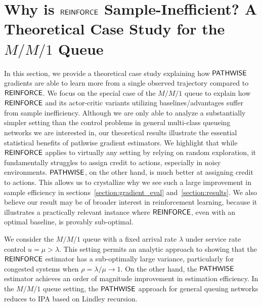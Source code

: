 


\section{Why is $\mathsf{REINFORCE}$ Sample-Inefficient? A Theoretical Case Study for the $M/M/1$ Queue}
\label{section:case_study}

In this section, we provide a theoretical case study explaining how $\mathsf{PATHWISE}$
gradients are able to learn more from a single observed trajectory compared to
$\mathsf{REINFORCE}$. We focus on the special case of the $M/M/1$ queue to explain how
$\mathsf{REINFORCE}$ and its actor-critic variants utilizing baselines/advantages suffer from
sample inefficiency.
Although we are only able to analyze a substantially simpler setting than the control problems in general multi-class queueing networks we are interested in, 
our theoretical results illustrate the essential statistical benefits of pathwise gradient estimators.
We highlight that while $\mathsf{REINFORCE}$ applies to virtually any setting by relying on random exploration, %
it fundamentally struggles to assign credit to actions, especially in noisy environments. $\mathsf{PATHWISE}$, on the other hand, is much better at assigning credit to actions. This allows us to crystallize why we see such a large improvement in sample efficiency in sections~\ref{section:gradient_eval} and~\ref{section:results}. We also believe our result may be of broader interest in reinforcement learning, because it illustrates a practically relevant instance where $\mathsf{REINFORCE}$, even with an optimal baseline, is provably sub-optimal. 

We consider the $M/M/1$ queue with a fixed arrival rate $\lambda$ under service rate control $u=\mu > \lambda$. This setting permits an analytic approach to showing that the $\mathsf{REINFORCE}$ estimator has a sub-optimally large variance, particularly for congested systems when $\rho = \lambda/\mu \to 1$. On the other hand, the $\mathsf{PATHWISE}$ estimator achieves an order of magnitude improvement in estimation efficiency. 
In the $M/M/1$ queue setting, the $\mathsf{PATHWISE}$ approach
for general queuing networks 
reduces to IPA based on Lindley recursion. 



